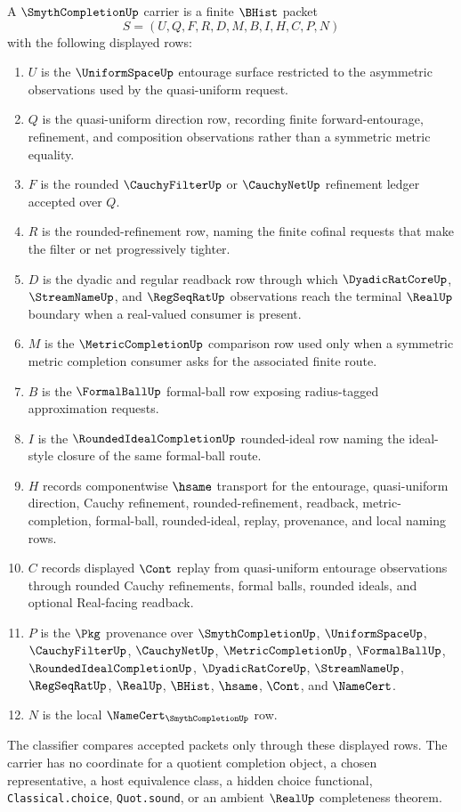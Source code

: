 \begin{definition}
\label{def:smyth-completion-carrier}
A $\SmythCompletionUp$ carrier is a finite $\BHist$ packet
$$
S=(U,Q,F,R,D,M,B,I,H,C,P,N)
$$
with the following displayed rows:
\begin{enumerate}
\item $U$ is the $\UniformSpaceUp$ entourage surface restricted to the asymmetric observations used by the quasi-uniform request.
\item $Q$ is the quasi-uniform direction row, recording finite forward-entourage, refinement, and composition observations rather than a symmetric metric equality.
\item $F$ is the rounded $\CauchyFilterUp$ or $\CauchyNetUp$ refinement ledger accepted over $Q$.
\item $R$ is the rounded-refinement row, naming the finite cofinal requests that make the filter or net progressively tighter.
\item $D$ is the dyadic and regular readback row through which $\DyadicRatCoreUp$, $\StreamNameUp$, and $\RegSeqRatUp$ observations reach the terminal $\RealUp$ boundary when a real-valued consumer is present.
\item $M$ is the $\MetricCompletionUp$ comparison row used only when a symmetric metric completion consumer asks for the associated finite route.
\item $B$ is the $\FormalBallUp$ formal-ball row exposing radius-tagged approximation requests.
\item $I$ is the $\RoundedIdealCompletionUp$ rounded-ideal row naming the ideal-style closure of the same formal-ball route.
\item $H$ records componentwise $\hsame$ transport for the entourage, quasi-uniform direction, Cauchy refinement, rounded-refinement, readback, metric-completion, formal-ball, rounded-ideal, replay, provenance, and local naming rows.
\item $C$ records displayed $\Cont$ replay from quasi-uniform entourage observations through rounded Cauchy refinements, formal balls, rounded ideals, and optional Real-facing readback.
\item $P$ is the $\Pkg$ provenance over $\SmythCompletionUp$, $\UniformSpaceUp$, $\CauchyFilterUp$, $\CauchyNetUp$, $\MetricCompletionUp$, $\FormalBallUp$, $\RoundedIdealCompletionUp$, $\DyadicRatCoreUp$, $\StreamNameUp$, $\RegSeqRatUp$, $\RealUp$, $\BHist$, $\hsame$, $\Cont$, and $\NameCert$.
\item $N$ is the local $\NameCert_{\SmythCompletionUp}$ row.
\end{enumerate}
The classifier compares accepted packets only through these displayed rows. The carrier has no coordinate for a quotient completion object, a chosen representative, a host equivalence class, a hidden choice functional, \texttt{Classical.choice}, \texttt{Quot.sound}, or an ambient $\RealUp$ completeness theorem.
\end{definition}

